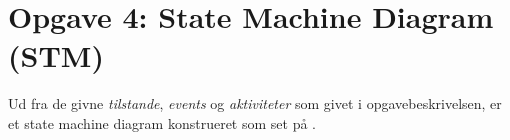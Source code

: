 \section{Opgave 4: State Machine Diagram (STM)}

Ud fra de givne \textit{tilstande}, \textit{events} og \textit{aktiviteter} som givet i opgavebeskrivelsen, er et state machine diagram konstrueret som set på .

